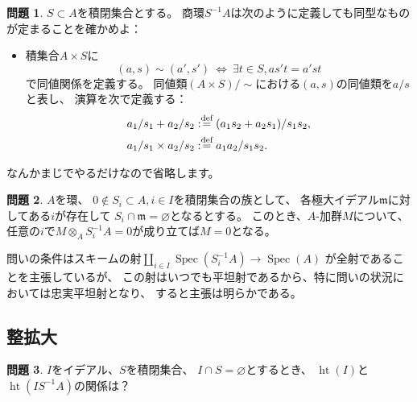 \documentclass[uplatex]{jsarticle}
\makeatletter
\theoremstyle{definition}
\newtheorem{prob}[prob]{問題}
\renewenvironment{proof}[1][\proofname]{
  \pushQED{\qed}%
  \normalfont \topsep6\p@\@plus6\p@\relax
  \trivlist
  \item[\hskip\labelsep
    #1\@addpunct{\textbf{.}}]\ignorespaces
}{%
  \popQED\endtrivlist\@endpefalse
}
\providecommand{\proofname}{証明}
\DeclareMathOperator{\Spec}{\mathrm{Spec}}
\DeclareMathOperator{\hight}{\mathrm{ht}}
\newcommand\mfm{\mathfrak{m}}
\renewcommand{\emptyset}{\varnothing}
\def\dfn{:\overset{\mbox{{\scriptsize def}}}{=}}
\makeatother
\begin{document}
\begin{prob}\label{prob: 2.3.1}
  \(S\subset A\)を積閉集合とする。
  商環\(S^{-1}A\)は次のように定義しても同型なものが定まることを確かめよ：
  \begin{itemize}
    \item
    積集合\(A\times S\)に
    \[
    (a,s) \sim (a',s') \ \iff \
    \exists t\in S, as't = a'st
    \]
    で同値関係を定義する。
    同値類\((A\times S)/\sim\)における\((a,s)\)の同値類を\(a/s\)と表し、
    演算を次で定義する：
    \begin{align*}
      a_1/s_1 + a_2/s_2 &\dfn (a_1s_2+a_2s_1)/s_1s_2, \\
      a_1/s_1 \times a_2/s_2 &\dfn a_1a_2/s_1s_2.
    \end{align*}
  \end{itemize}
\end{prob}

\begin{proof}
  なんかまじでやるだけなので省略します。
\end{proof}



\begin{prob}\label{prob: 2.3.2}
  \(A\)を環、
  \(0\not\in S_i\subset A, i\in I\)を積閉集合の族として、
  各極大イデアル\(\mfm\)に対してある\(i\)が存在して
  \(S_i\cap \mfm = \emptyset\)となるとする。
  このとき、\(A\)-加群\(M\)について、
  任意の\(i\)で\(M\otimes_A S_i^{-1}A = 0\)が成り立てば\(M=0\)となる。
\end{prob}

\begin{proof}
  問いの条件はスキームの射\(\coprod_{i\in I}\Spec(S^{-1}_i A) \to \Spec(A)\)
  が全射であることを主張しているが、
  この射はいつでも平坦射であるから、特に問いの状況においては忠実平坦射となり、
  すると主張は明らかである。
\end{proof}







\subsection{整拡大}



\begin{prob}\label{prob: 2.4.1}
  \(I\)をイデアル、\(S\)を積閉集合、
  \(I\cap S = \emptyset\)とするとき、
  \(\hight(I)\)と\(\hight(I S^{-1}A)\)の関係は？
\end{prob}
\end{document}
